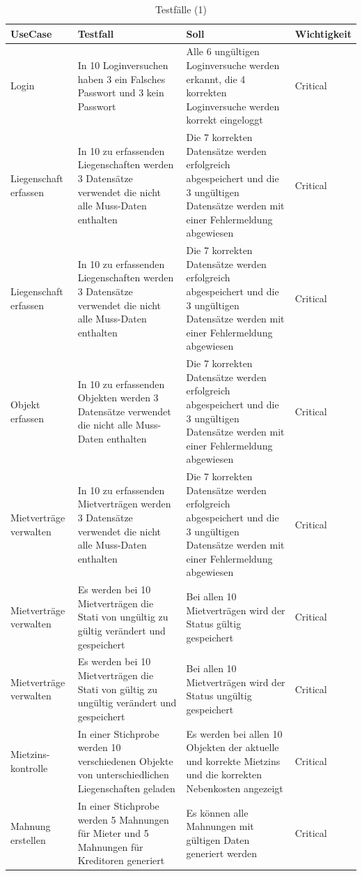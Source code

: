 \begin{table}[H]
  \centering
  \settowidth{}
  \setlength\extrarowheight{2pt}
  \begin{tabulary}{1.0\textwidth}{|L|L|L|L|}
    \hline
    \textbf{UseCase} & 
    \textbf{Testfall}& 
    \textbf{Soll} &
    \textbf{Wichtigkeit}\\
    \hline
    Login & In 10 Loginversuchen haben 3 ein Falsches Passwort und 3 kein Passwort & Alle 6 ungültigen Loginversuche werden erkannt, die 4 korrekten Loginversuche werden korrekt eingeloggt & Critical\\
    \hline
    Liegenschaft erfassen & In 10 zu erfassenden Liegenschaften werden 3 Datensätze verwendet die nicht alle Muss-Daten enthalten & Die 7 korrekten Datensätze werden erfolgreich abgespeichert und die 3 ungültigen Datensätze werden mit einer Fehlermeldung abgewiesen & Critical\\
    \hline
    Liegenschaft erfassen & In 10 zu erfassenden Liegenschaften werden 3 Datensätze verwendet die nicht alle Muss-Daten enthalten & Die 7 korrekten Datensätze werden erfolgreich abgespeichert und die 3 ungültigen Datensätze werden mit einer Fehlermeldung abgewiesen & Critical\\
    \hline
    Objekt erfassen & In 10 zu erfassenden Objekten werden 3 Datensätze verwendet die nicht alle Muss-Daten enthalten & Die 7 korrekten Datensätze werden erfolgreich abgespeichert und die 3 ungültigen Datensätze werden mit einer Fehlermeldung abgewiesen & Critical\\
    \hline
    Mietverträge verwalten & In 10 zu erfassenden Mietverträgen werden 3 Datensätze verwendet die nicht alle Muss-Daten enthalten & Die 7 korrekten Datensätze werden erfolgreich abgespeichert und die 3 ungültigen Datensätze werden mit einer Fehlermeldung abgewiesen & Critical\\
    \hline
    Mietverträge verwalten & Es werden bei 10 Mietverträgen die Stati von ungültig zu gültig verändert und gespeichert & Bei allen 10 Mietverträgen wird der Status gültig gespeichert & Critical\\
    \hline
    Mietverträge verwalten & Es werden bei 10 Mietverträgen die Stati von gültig zu ungültig verändert und gespeichert & Bei allen 10 Mietverträgen wird der Status ungültig gespeichert & Critical\\
    \hline
    Mietzins-kontrolle & In einer Stichprobe werden 10 verschiedenen Objekte von unterschiedlichen Liegenschaften geladen & Es werden bei allen 10 Objekten der aktuelle und korrekte Mietzins und die korrekten Nebenkosten angezeigt & Critical\\
    \hline
    Mahnung erstellen & In einer Stichprobe werden 5 Mahnungen für Mieter und 5 Mahnungen für Kreditoren generiert & Es können alle Mahnungen mit gültigen Daten generiert werden & Critical\\
    \hline
  \end{tabulary}
  \caption{Testfälle (1)}
  \label{Testfälle1}
\end{table}

